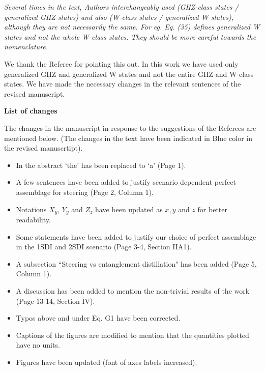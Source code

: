 \documentclass[12pt]{revtex4-1}
\newcommand{\red}{\color[rgb]{0.8,0,0}}
\newcommand{\blue}{\color[rgb]{0,0,0.6}}
\begin{document}
{\red{\bf{Referee's Comment:}}} \textit{Several times in the text, Authors interchangeably used (GHZ-class
states / generalized GHZ states) and also (W-class states /
generalized W states), although they are not necessarily the same. For
eg. Eq. (35) defines generalized W states and not the whole W-class
states. They should be more careful towards the nomenclature.}

{\blue{\bf{Author's Response:}}} We thank the Referee for pointing this out. In this work we have used only generalized GHZ and generalized W states and not the entire GHZ and W class states. 
We have made the necessary changes in the relevant sentences of the revised manuscript.\\


\clearpage
\begin{center}
   \textbf{List of changes}
\end{center}

The changes in the manuscript in response to the suggestions of the Referees
are mentioned below. (The changes in the text have been indicated in Blue color
in the revised manuscrtipt).
\begin{itemize}
\item In the abstract `the' has been replaced to `a' (Page 1).
\item A few sentences have been added to justify scenario dependent perfect assemblage for steering  (Page 2, Column 1).
\item Notations $X_y$, $Y_y$ and $Z_z$ have been updated as $x, y$ and $z$   for better readability.
\item Some statements have been added to justify our choice of perfect assemblage in the 1SDI and 2SDI scenario (Page 3-4, Section IIA1).
\item A subsection ``Steering vs entanglement distillation" has been added (Page 5, Column 1).
\item A discussion has been added to mention the non-trivial results of the work (Page 13-14, Section IV).
\item Typos above and under Eq. G1 have been corrected.
\item Captions of the figures are modified to mention that the quantities plotted have no units.
\item Figures have been updated (font of axes labels increased).


\end{itemize}
\end{document}
